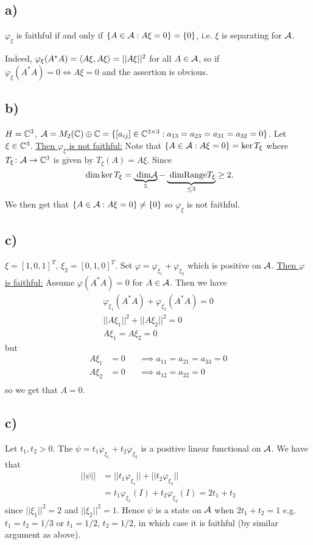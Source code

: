 \documentclass[10pt,english,a4paper]{article}
\theoremstyle{definition}
\def\vphi{\varphi}
\begin{document}
\subsection*{a)}
$\vphi_{\xi}$ is faithful if and only if $\{A \in \mathcal{A}: A\xi=0\}= \{0\}$, i.e. $\xi$
is separating for $\mathcal{A}$.

Indeed, $\vphi_{\xi}(A^*A)= \ind{A\xi,A\xi} = ||A\xi||^2$ for all $A \in \mathcal{A}$, so
if $\vphi_{\xi}(A^*A) = 0 \iff A\xi =0$ and the assertion is obvious. 

\subsection*{b)}
$H = \mathbb{C}^3$, $\mathcal{A} = M_2(\mathbb{C})\oplus \mathbb{C} = \{[a_{ij}]\in \mathbb{C}^{3\times 3} :
a_{13}=a_{23} = a_{31} = a_{32} = 0\}$.
Let $\xi \in \mathbb{C}^3$. \ul{Then $\vphi_{\xi}$ is not faithful:}
Note that $\{A \in \mathcal{A} : A\xi =0\} = \ker T_{\xi}$ where $T_{\xi}\colon\mathcal{A}\to\mathbb{C}^3$
is given by $T_{\xi}(A)= A\xi$. Since \[\text{ dim} \ker T_{\xi} = \underbrace{\text{ dim} \mathcal{A}}_{5}  -
\underbrace{\text{ dim} \text{Range}T_{\xi}}_{\leq 3} \geq 2.\]
We then get that 
$\{A\in \mathcal{A}: A\xi = 0 \}\neq\{0\}$ so $\vphi_{\xi}$ is not faithful. 

\subsection*{c)}
$\xi = [1,0,1]^T$, $\xi_2 = [0,1,0]^T$. Set $\vphi = \vphi_{\xi_1} + \vphi_{\xi_2}$ 
which is positive on $\mathcal{A}$. 
\ul{Then $\vphi$ is faithful:}
Assume $\vphi(A^*A) = 0$ for $A \in \mathcal{A}$. Then we have 
\begin{align*}
   \vphi_{\xi_1}(A^*A) + \vphi_{\xi_2}(A^*A) = 0 \\ 
   ||A\xi_1||^2 + ||A\xi_2||^2 = 0 \\
   A\xi_1 = A\xi_2 = 0 
\end{align*}
but 
\begin{align*}
    A\xi_1 &= 0 &&\implies a_{11} = a_{21} = a_{33} = 0 \\ 
    A\xi_2 &= 0 &&\implies a_{12} = a_{22} = 0 \\ 
\end{align*}
so we get that $A = 0$.

\subsection*{c)}
Let $t_1, t_2 > 0$. The 
$\psi = t_1\vphi_{\xi_1} + t_2\vphi_{\xi_2}$ is a positive linear functional on 
$\mathcal{A}$. We have that 
\begin{align*}
||\psi|| &= ||t_1\vphi_{\xi_1}||+||t_2\vphi_{\xi_2}|| \\
&= t_1\vphi_{\xi_1}(I) + t_2\vphi_{\xi_2}(I) = 2t_1 + t_2
\end{align*}
since $||\xi_1||^2 = 2$ and $||\xi_2||^2 = 1$.
Hence $\psi$ is a state on $\mathcal{A}$ when 
$2t_1 + t_2 = 1$ e.g. $t_1 = t_2 = 1/3$ or $t_1 = 1/2$, $t_2 = 1/2$, in which case 
it is faithful (by similar argument as above).
\end{document}
